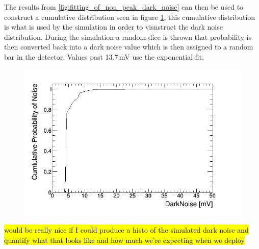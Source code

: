 The results from \ref{fig:fitting_of_non_peak_dark_noise} can then be used to construct a cumulative distribution seen in figure \ref{fig:cumulative_prob_dark}, this cumulative distribution is what is used by the simulation in order to visnstruct the dark noise distribution. During the simulation a random dice is thrown that probability is then converted back into a dark noise value which is then assigned to a random bar in the detector. Values past 13.7\,mV use the exponential fit.
\begin{figure}[htbp]
 \centering
 \includegraphics[width=0.8\linewidth]{cumulative_prob_dark_noise.png}
 \label{fig:cumulative_prob_dark}
\end{figure}
\hl{would be really nice if I could produce a histo of the simulated dark noise and quantify what that looks like and how much we're expecting when we deploy}

